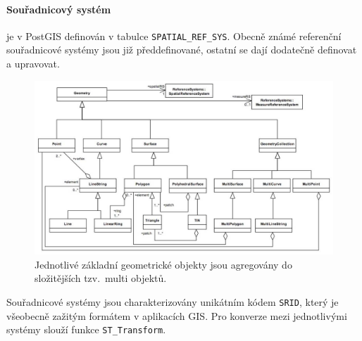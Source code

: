 \documentclass[a4paper,12pt,oneside]{report}
\begin{document}
\paragraph*{Souřadnicový systém} je v PostGIS definován v tabulce
\texttt{SPATIAL\_REF\_SYS}. Obecně známé referenční souřadnicové systémy jsou již
předdefinované, ostatní se dají dodatečně definovat a upravovat.

\newpage %

\begin{figure}[h!]
    \centering
    \includegraphics[width=1\textwidth]{./img/implementace/ogc1.jpg}
    \caption[Model PostGIS]{\centering Jednotlivé základní geometrické objekty 
    jsou agregovány do složitějších tzv.~multi objektů.     \footnotemark}
 \end{figure}   


Souřadnicové systémy jsou charakterizovány unikátním kódem
\texttt{\acs{SRID}}, který je všeobecně zažitým formátem v aplikacích GIS.
Pro konverze mezi jednotlivými systémy slouží funkce
\texttt{ST\_Transform}.
\end{document}
